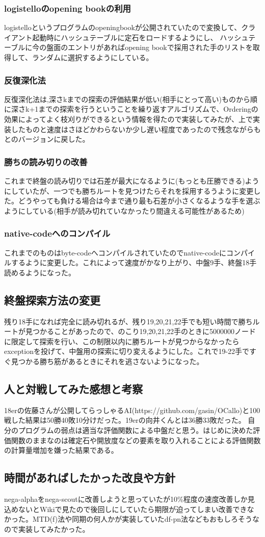 \documentclass[11pt,a4paper]{jsarticle}
\begin{document}
\subsubsection*{logistelloのopening bookの利用}
logistelloというプログラムのopeningbookが公開されていたので変換して、クライアント起動時にハッシュテーブルに定石をロードするようにし、
ハッシュテーブルに今の盤面のエントリがあればopening bookで採用された手のリストを取得して、ランダムに選択するようにしている。
\subsubsection*{反復深化法}
反復深化法は,深さkまでの探索の評価結果が低い(相手にとって高い)ものから順に深さk+1までの探索を行うということを繰り返すアルゴリズムで、Orderingの効果によってよく枝刈りができるという情報を得たので実装してみたが、上で実装したものと速度はさほどかわらないか少し遅い程度であったので残念ながらもとのバージョンに戻した。
\subsubsection*{勝ちの読み切りの改善}
これまで終盤の読み切りでは石差が最大になるように(もっとも圧勝できる)ようにしていたが、一つでも勝ちルートを見つけたらそれを採用するうように変更した。どうやっても負ける場合は今まで通り最も石差が小さくなるような手を選ぶようにしている(相手が読み切れていなかったり間違える可能性があるため)
\subsubsection*{native-codeへのコンパイル}
これまでのものはbyte-codeへコンパイルされていたのでnative-codeにコンパイルするように変更した。これによって速度がかなり上がり、中盤9手、終盤18手読めるようになった。
\subsection*{終盤探索方法の変更}
残り18手になれば完全に読み切れるが、残り19,20,21,22手でも短い時間で勝ちルートが見つかることがあったので、のこり19,20,21,22手のときに5000000ノードに限定して探索を行い、この制限以内に勝ちルートが見つからなかったらexceptionを投げて、中盤用の探索に切り変えるようにした。これで19-22手ですぐ見つかる勝ち筋があるときにそれを逃さないようになった。
\subsection*{人と対戦してみた感想と考察}
18erの佐藤さんが公開してらっしゃるAI(https://github.com/gasin/OCallo)と100戦した結果は50勝40敗10分けだった。19erの向井くんとは36勝33敗だった。
自分のプログラムの弱点は適当な評価関数による中盤だと思う。はじめに決めた評価関数のままなのは確定石や開放度などの要素を取り入れることによる評価関数の計算量増加を嫌った結果である。
\subsection*{時間があればしたかった改良や方針}
nega-alphaをnega-scoutに改善しようと思っていたが10\%程度の速度改善しか見込めないとWikiで見たので後回しにしていたら期限が迫ってしまい改善できなかった。MTD(f)法や同期の何人かが実装していたdf-pn法などもおもしろそうなので実装してみたかった。
\end{document}
